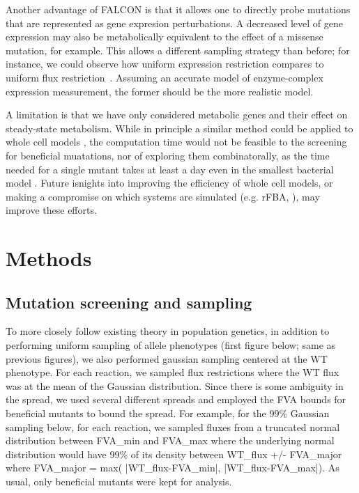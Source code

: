Another advantage of FALCON is that it allows one to directly probe
mutations that are represented as gene expresion perturbations. A
decreased level of gene expression may also be metabolically
equivalent to the effect of a missense mutation, for example. This
allows a different sampling strategy than before; for instance, we
could observe how uniform expression restriction compares to uniform
flux restriction~\citep{Xu2012}. Assuming an accurate model of
enzyme-complex expression measurement, the former should be the more
realistic model.

A limitation is that we have only considered metabolic genes and their
effect on steady-state metabolism. While in principle a similar method
could be applied to whole cell models \citep{Karr2012, O'Brien2013}, the
computation time would not be feasible to the screening for beneficial
muatations, nor of exploring them combinatorally, as the time needed
for a single mutant takes at least a day even in the smallest
bacterial model \citep{Karr2012}. Future isnights into improving the
efficiency of whole cell models, or making a compromise on which
systems are simulated (e.g. rFBA, \citep{Covert2001}), may improve
these efforts.

\section{Methods}
\label{sec:epiBeneMethod}

\subsection{Mutation screening and sampling}
\label{sec:epiBeneMethodSS}
To more closely follow existing theory in population genetics, in
addition to performing uniform sampling of allele phenotypes (first
figure below; same as previous figures), we also performed gaussian
sampling centered at the WT phenotype.  For each reaction, we sampled
flux restrictions where the WT flux was at the mean of the Gaussian
distribution. Since there is some ambiguity in the spread, we used
several different spreads and employed the FVA bounds for beneficial
mutants to bound the spread.  For example, for the 99\% Gaussian
sampling below, for each reaction, we sampled fluxes from a truncated
normal distribution between FVA\_min and FVA\_max where the underlying
normal distribution would have 99\% of its density between WT\_flux +/-
FVA\_major where FVA\_major = max( |WT\_flux-FVA\_min|,
|WT\_flux-FVA\_max|).  As usual, only beneficial mutants were kept for
analysis.

